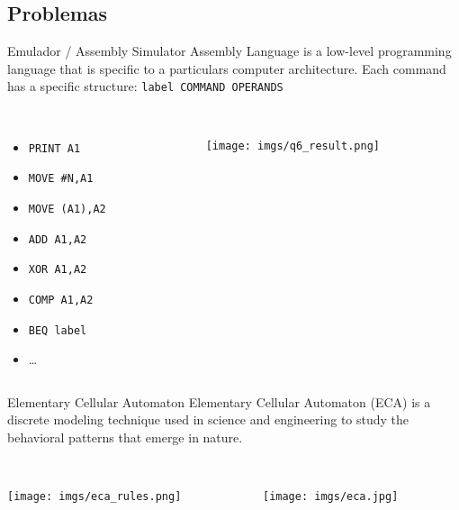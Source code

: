 \subsection{Problemas}
\begin{frame}{Emulador / Assembly Simulator}
    \small
    Assembly Language is a low-level programming language that is specific to a particulars computer
    architecture. Each command has a specific structure: \texttt{label COMMAND OPERANDS} \\~
    
    \begin{columns}
    \begin{column}{0.50\textwidth}
        \begin{itemize}
            \item \texttt{PRINT A1}
            \item \texttt{MOVE \#N,A1}
            \item \texttt{MOVE (A1),A2}
            \item \texttt{ADD A1,A2}
            \item \texttt{XOR A1,A2}
            \item \texttt{COMP A1,A2}
            \item \texttt{BEQ label}
            \item \ldots
        \end{itemize}
    \end{column}
    \begin{column}{0.50\textwidth}
        \texttt{[image: imgs/q6\_result.png]}
    \end{column}
    \end{columns}
\end{frame}

\begin{frame}{Elementary Cellular Automaton}
    Elementary Cellular Automaton (ECA) is a discrete modeling technique used in science and engineering to
    study the behavioral patterns that emerge in nature. \\~

    \begin{columns}
    \begin{column}{0.50\textwidth}
        \texttt{[image: imgs/eca\_rules.png]}
    \end{column}
    
    \begin{column}{0.50\textwidth}
        \texttt{[image: imgs/eca.jpg]}
    \end{column}
    \end{columns}
\end{frame}

